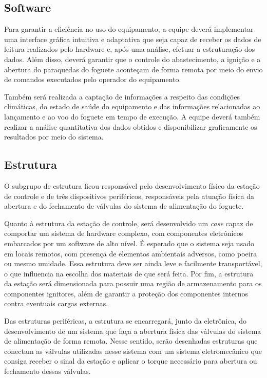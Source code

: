 \subsection{Software}
\par Para garantir a eficiência no uso do equipamento, a equipe deverá implementar uma interface gráfica intuitiva e adaptativa que seja capaz de receber os dados de leitura realizados pelo hardware e, após uma análise, efetuar a estruturação dos dados. Além disso, deverá garantir que o controle do abastecimento, a ignição e a abertura do paraquedas do foguete aconteçam de forma remota por meio do envio de comandos executados pelo operador do equipamento.  
\par Também será realizada a captação de informações a respeito das condições climáticas, do estado de saúde do equipamento e das informações relacionadas ao lançamento e ao voo do foguete em tempo de execução. A equipe deverá também realizar a análise quantitativa dos dados obtidos e disponibilizar graficamente os resultados por meio do sistema. 

\subsection{Estrutura}
\par O subgrupo de estrutura ficou responsável pelo desenvolvimento físico da estação de controle e de três dispositivos periféricos, responsáveis pela atuação física da abertura e do fechamento de válvulas do sistema de alimentação do foguete.
\par Quanto à estrutura da estação de controle, será desenvolvido um \textit{case} capaz de comportar um sistema de hardware complexo, com componentes eletrônicos embarcados por um software de alto nível. É esperado que o sistema seja usado em locais remotos, com presença de elementos ambientais adversos, como poeira ou mesmo umidade. Essa estrutura deve ser ainda leve e facilmente transportável, o que influencia na escolha dos materiais de que será feita. Por fim, a estrutura da estação será dimensionada para possuir uma região de armazenamento para os componentes ignitores, além de garantir a proteção dos componentes internos contra eventuais cargas externas.
\par Das estruturas periféricas, a estrutura se encarregará, junto da eletrônica, do desenvolvimento de um sistema que faça a abertura física das válvulas do sistema de alimentação de forma remota. Nesse sentido, serão desenhadas estruturas que conectam as válvulas utilizadas nesse sistema com um sistema eletromecânico que consiga receber o sinal da estação e aplicar o torque necessário para abertura ou fechamento dessas válvulas.

